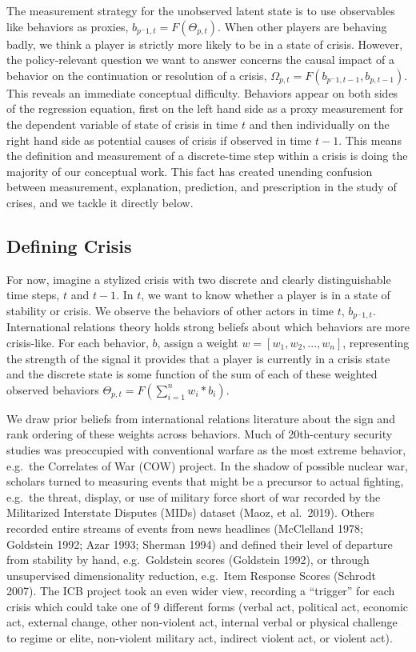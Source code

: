 \documentclass[
]{article}
\begin{document}
The measurement strategy for the unobserved latent state is to use
observables like behaviors as proxies, \(b_{p^-1,t}=F(\Theta_{p,t})\).
When other players are behaving badly, we think a player is strictly
more likely to be in a state of crisis. However, the policy-relevant
question we want to answer concerns the causal impact of a behavior on
the continuation or resolution of a crisis,
\(\Omega_{p,t}=F(b_{p^-1,t-1},b_{p,t-1})\). This reveals an immediate
conceptual difficulty. Behaviors appear on both sides of the regression
equation, first on the left hand side as a proxy measurement for the
dependent variable of state of crisis in time \(t\) and then
individually on the right hand side as potential causes of crisis if
observed in time \(t-1\). This means the definition and measurement of a
discrete-time step within a crisis is doing the majority of our
conceptual work. This fact has created unending confusion between
measurement, explanation, prediction, and prescription in the study of
crises, and we tackle it directly below.

\subsection{Defining Crisis}\label{defining-crisis}

For now, imagine a stylized crisis with two discrete and clearly
distinguishable time steps, \(t\) and \(t-1\). In \(t\), we want to know
whether a player is in a state of stability or crisis. We observe the
behaviors of other actors in time \(t\), \(b_{p^-1,t}\). International
relations theory holds strong beliefs about which behaviors are more
crisis-like. For each behavior, \(b\), assign a weight
\(w=[w_1,w_2,...,w_n]\), representing the strength of the signal it
provides that a player is currently in a crisis state and the discrete
state is some function of the sum of each of these weighted observed
behaviors \(\Theta_{p,t}=F(\sum^n_{i=1}w_i*b_i)\).

We draw prior beliefs from international relations literature about the
sign and rank ordering of these weights across behaviors. Much of
20th-century security studies was preoccupied with conventional warfare
as the most extreme behavior, e.g.~the Correlates of War (COW) project.
In the shadow of possible nuclear war, scholars turned to measuring
events that might be a precursor to actual fighting, e.g.~the threat,
display, or use of military force short of war recorded by the
Militarized Interstate Disputes (MIDs) dataset (Maoz, et al.~2019).
Others recorded entire streams of events from news headlines (McClelland
1978; Goldstein 1992; Azar 1993; Sherman 1994) and defined their level
of departure from stability by hand, e.g.~Goldstein scores (Goldstein
1992), or through unsupervised dimensionality reduction, e.g.~Item
Response Scores (Schrodt 2007). The ICB project took an even wider view,
recording a ``trigger'' for each crisis which could take one of 9
different forms (verbal act, political act, economic act, external
change, other non-violent act, internal verbal or physical challenge to
regime or elite, non-violent military act, indirect violent act, or
violent act).
\end{document}
